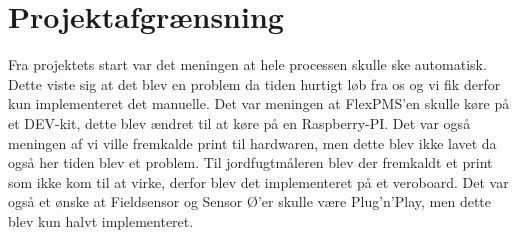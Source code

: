 \chapter{Projektafgrænsning}
Fra projektets start var det meningen at hele processen skulle ske automatisk. Dette viste sig at det blev en problem da tiden hurtigt løb fra os og vi fik derfor kun implementeret det manuelle. Det var meningen at FlexPMS'en skulle køre på et DEV-kit, dette blev ændret til at køre på en Raspberry-PI. Det var også meningen af vi ville fremkalde print til hardwaren, men dette blev ikke lavet da også her tiden blev et problem. Til jordfugtmåleren blev der fremkaldt et print som ikke kom til at virke, derfor blev det implementeret på et veroboard. Det var også et ønske at Fieldsensor og Sensor Ø'er skulle være Plug'n'Play, men dette blev kun halvt implementeret.